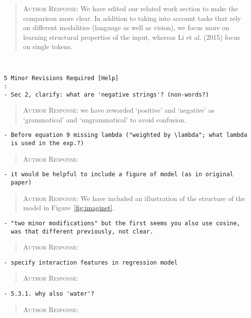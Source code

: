 \begin{quote}
\textsc{Author Response:} We have edited our related work section to make the comparison more 
clear. In addition to taking into account tasks that rely on different modalities (language as well as vision), 
we focus more on learning structural properties of the input, whereas Li et al. (2015) focus on single
tokens.
\end{quote}
\begin{verbatim}


5 Minor Revisions Required [Help]
: 
- Sec 2, clarify: what are 'negative strings'? (non-words?)
\end{verbatim}  
\begin{quote}
\textsc{Author Response:}  we have reworded `positive' and `negative' as `grammatical' and `ungrammatical' to avoid confusion.
\end{quote}
\begin{verbatim}
- Before equation 9 missing lambda ("weighted by \lambda"; what lambda
  is used in the exp.?)
\end{verbatim}  
\begin{quote}
\textsc{Author Response:}  
\end{quote}
\begin{verbatim}
- it would be helpful to include a figure of model (as in original
  paper)
\end{verbatim}  
\begin{quote}
\textsc{Author Response:}  We have included an illustration of the structure of the model in Figure~\ref{fig:imaginet}.
\end{quote}
\begin{verbatim}
- "two minor modifications" but the first seems you also use cosine,
  was that different previously, not clear.
\end{verbatim}  
\begin{quote}
\textsc{Author Response:}  
\end{quote}
\begin{verbatim}
- specify interaction features in regression model
\end{verbatim}  
\begin{quote}
\textsc{Author Response:}  
\end{quote}
\begin{verbatim}
- 5.3.1. why also 'water'?
\end{verbatim}  
\begin{quote}
\textsc{Author Response:}  
\end{quote}
